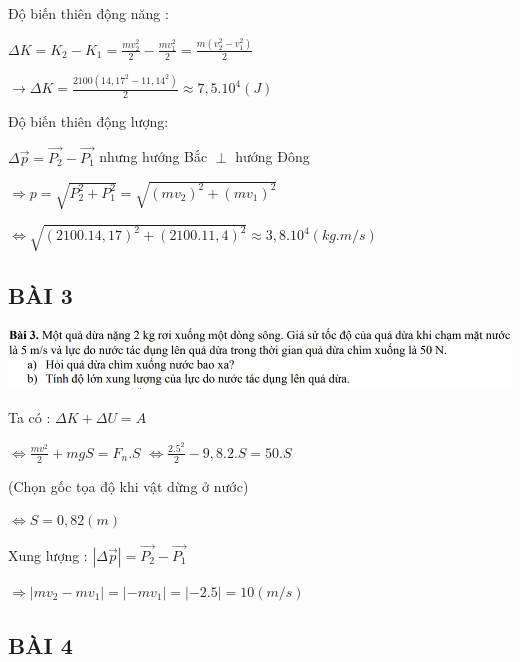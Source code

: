 \documentclass[12pt,a4paper]{article}
\begin{document}
\vspace*{1cm}
Độ biến thiên động năng : 

$\Delta K = K_2 - K_1 = \frac{mv_2^2}{2} - \frac{mv_1^2}{2} =  \frac{m(v_2^2 - v_1^2)}{2}$

\vspace*{1cm}
$\to\Delta K = \frac{2100(14,17^2 - 11,14^2)}{2} \approx 7,5.10^4 (J)$

\vspace*{1cm}
Độ biến thiên động lượng:

\vspace*{1cm}
$\Delta \vec{p} = \vec{P_2} - \vec{P_1}$ nhưng hướng Bắc $\perp$ hướng Đông

\vspace*{1cm}
$ \Rightarrow p = \sqrt{P_2^2 + P_1^2} = \sqrt{(mv_2)^2 + (mv_1)^2} $

\vspace*{1cm}
$ \Leftrightarrow \sqrt{(2100.14,17)^2 + (2100.11,4)^2} \approx 3,8.10^4 (kg.m/s)$

\Large \subsection{\color{blue}\textbf{BÀI 3} }

\vspace*{1cm}
\includegraphics[scale=0.80]{No3.jpg}

\vspace*{1cm}
Ta có : $\Delta K + \Delta U = A$

\vspace*{1cm}
$\Leftrightarrow \frac{mv^2}{2} + mgS = F_n.S$
$\Leftrightarrow \frac{2.5^2}{2} - 9,8.2.S = 50.S $

\vspace*{1cm}
(Chọn gốc tọa độ khi vật dừng ở nước)

\vspace*{1cm}
$\Leftrightarrow S = 0,82 (m)$

\vspace*{1cm}
Xung lượng : $|\Delta \vec{p} | = \vec{P_2} - \vec{P_1} $

\vspace*{1cm}
$\Rightarrow| mv_2 - mv_1| = |-mv_1| = |-2.5| = 10 (m/s)$

\Large \subsection{\color{blue}\textbf{BÀI 4} }
\end{document}

